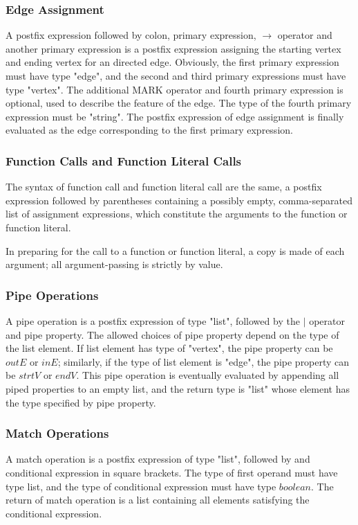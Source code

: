 \documentclass[letterpaper,12pt]{article}
\begin{document}
\subsubsection{Edge Assignment}
A postfix expression followed by colon, primary expression, $\rightarrow$ operator and another primary expression is a postfix expression assigning the starting vertex and ending vertex for an directed edge. Obviously, the first primary expression must have type "edge", and the second and third primary expressions must have type "vertex". The additional MARK operator and fourth primary expression is optional, used to describe the  feature of the edge. The type of the fourth primary expression must be "string". The postfix expression of edge assignment is finally evaluated as the edge corresponding to the first primary expression.

\subsubsection{Function Calls and Function Literal Calls}
The syntax of function call and function literal call are the same, a postfix expression followed by parentheses containing a possibly empty, comma-separated list of assignment expressions, which constitute the arguments to the function or function literal. \newline

In preparing for the call to a function or function literal, a copy is made of each argument; all argument-passing is strictly by value. 

\subsubsection{Pipe Operations}
A pipe operation is a postfix expression of type "list", followed by the $|$ operator and pipe property. The allowed choices of pipe property depend on the type of the list element. If list element has type of "vertex", the pipe property can be $outE$ or $inE$; similarly, if the type of list element is "edge", the pipe property can be $strtV$ or $endV$. 
This pipe operation is eventually evaluated by appending all piped properties to an empty list, and the return type is "list" whose element has the type specified by pipe property.

\subsubsection{Match Operations}
A match operation is a postfix expression of type "list", followed by and conditional expression in square brackets. The type of first operand must have type list, and the type of conditional expression must have type $boolean$. The return of match operation is a list containing all elements satisfying the conditional expression. \newline
\end{document}
